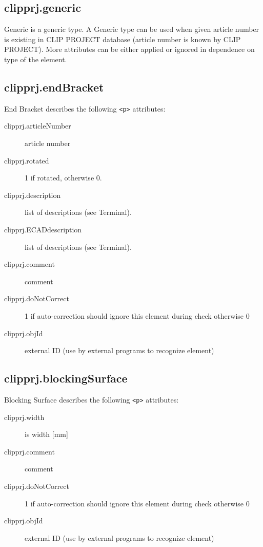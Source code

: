 \documentclass[%
	a4paper,
	oneside,
	listof=numbered,
	parskip=half,
	headsepline=true,
	footsepline=false,
	0.7headlines,
	]{scrbook}
\begin{document}
\subsection{clipprj.generic}
 
Generic is a generic type.
A Generic type can be used when given article number is existing in CLIP PROJECT database (article number is known by CLIP PROJECT).
More attributes can be either applied or ignored in dependence on type of the element.

\subsection{clipprj.endBracket}
 
End Bracket describes the following \verb|<p>| attributes: 

\begin{description}
	\item[clipprj.articleNumber] article number 
	\item[clipprj.rotated] 1 if rotated, otherwise 0. 
	\item[clipprj.description] list of descriptions (see Terminal). 
	\item[clipprj.ECADdescription] list of descriptions (see Terminal). 
	\item[clipprj.comment] comment 
	\item[clipprj.doNotCorrect] 1 if auto-correction should ignore this element during check otherwise 0 
	\item[clipprj.objId] external ID (use by external programs to recognize element) 
\end{description}

\subsection{clipprj.blockingSurface}
 
Blocking Surface describes the following \verb|<p>| attributes: 

\begin{description}
	\item[clipprj.width] is width [mm] 
	\item[clipprj.comment] comment 
	\item[clipprj.doNotCorrect] 1 if auto-correction should ignore this element during check otherwise 0 
	\item[clipprj.objId] external ID (use by external programs to recognize element) 
\end{description}
\end{document}
